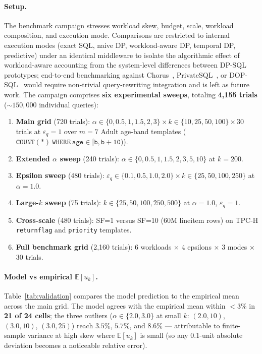 \documentclass[sigconf,nonacm]{acmart}
\newcommand{\eps}{\varepsilon}
\newcommand{\E}{\mathbb{E}}
\begin{document}
\paragraph{Setup.} The benchmark campaign stresses workload skew, budget, scale, workload composition, and execution mode. Comparisons are restricted to internal execution modes (exact SQL, naive DP, workload-aware DP, temporal DP, predictive) under an identical middleware to isolate the algorithmic effect of workload-aware accounting from the system-level differences between DP-SQL prototypes; end-to-end benchmarking against Chorus~\cite{johnson2020chorus}, PrivateSQL~\cite{kotsogiannis2019privatesql}, or DOP-SQL~\cite{yu2024dopsql} would require non-trivial query-rewriting integration and is left as future work. The campaign comprises \textbf{six experimental sweeps}, totaling \textbf{4{,}155 trials} ($\sim 150{,}000$ individual queries):

\begin{enumerate}
    \item \textbf{Main grid} (720 trials): $\alpha \in \{0,0.5,1,1.5,2,3\}\times k \in \{10,25,50,100\}\times 30$ trials at $\eps_q=1$ over $m=7$ Adult age-band templates ($\mathtt{COUNT(*)\ WHERE\ age \in [b, b+10)}$).
    \item \textbf{Extended $\alpha$ sweep} (240 trials): $\alpha \in \{0,0.5,1,1.5,2,3,5,10\}$ at $k=200$.
    \item \textbf{Epsilon sweep} (480 trials): $\eps_q \in \{0.1, 0.5, 1.0, 2.0\}\times k \in \{25,50,100,250\}$ at $\alpha=1.0$.
    \item \textbf{Large-$k$ sweep} (75 trials): $k \in \{25, 50, 100, 250, 500\}$ at $\alpha=1.0$, $\eps_q=1$.
    \item \textbf{Cross-scale} (480 trials): SF=1 versus SF=10 (60M lineitem rows) on TPC-H \texttt{returnflag} and \texttt{priority} templates.
    \item \textbf{Full benchmark grid} (2{,}160 trials): 6 workloads $\times$ 4 epsilons $\times$ 3 modes $\times$ 30 trials.
\end{enumerate}

\paragraph{Model vs empirical $\E[u_k]$.} Table~\ref{tab:validation} compares the model prediction to the empirical mean across the main grid. The model agrees with the empirical mean within $<3\%$ in \textbf{21 of 24 cells}; the three outliers ($\alpha\in\{2.0,3.0\}$ at small $k$: $(2.0,10)$, $(3.0,10)$, $(3.0,25)$) reach $3.5\%$, $5.7\%$, and $8.6\%$ — attributable to finite-sample variance at high skew where $\E[u_k]$ is small (so any 0.1-unit absolute deviation becomes a noticeable relative error).
\end{document}
